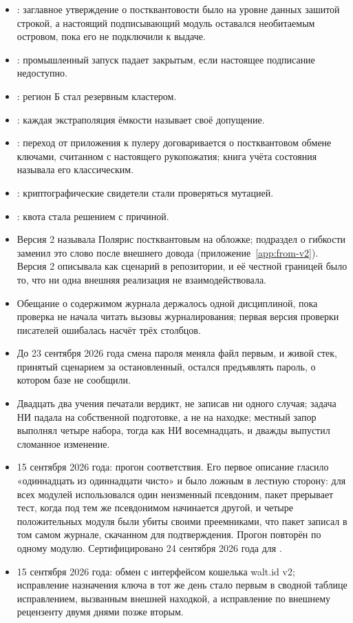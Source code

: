 \begin{itemize}
  \item {}: заглавное утверждение о постквантовости было на уровне данных зашитой строкой, а
    настоящий подписывающий модуль оставался необитаемым островом, пока его не подключили к выдаче.
  \item {}: промышленный запуск падает закрытым, если настоящее подписание недоступно.
  \item {}: регион Б стал резервным кластером.
  \item {}: каждая экстраполяция ёмкости называет своё допущение.
  \item {}: переход от приложения к пулеру договаривается о постквантовом обмене ключами,
    считанном с настоящего рукопожатия; книга учёта состояния называла его классическим.
  \item {}: криптографические свидетели стали проверяться мутацией.
  \item {}: квота стала решением с причиной.
  \item Версия 2 называла Полярис постквантовым на обложке; подраздел о гибкости заменил это слово
    после внешнего довода (приложение~\ref{app:from-v2}). Версия 2 описывала  как
    сценарий в репозитории, и её честной границей было то, что ни одна внешняя реализация не
    взаимодействовала.
  \item Обещание о содержимом журнала держалось одной дисциплиной, пока проверка не начала читать
    вызовы журналирования; первая версия проверки писателей ошибалась насчёт трёх столбцов.
  \item До 23 сентября 2026 года смена пароля меняла файл первым, и живой стек, принятый сценарием за
    остановленный, остался предъявлять пароль, о котором базе не сообщили.
  \item Двадцать два учения печатали вердикт, не записав ни одного случая; задача НИ падала на
    собственной подготовке, а не на находке; местный запор выполнял четыре набора, тогда как НИ
    восемнадцать, и дважды выпустил сломанное изменение.
\end{itemize}

\begin{itemize}
  \item 15 сентября 2026 года: прогон соответствия. Его первое описание гласило «одиннадцать из
    одиннадцати чисто» и было ложным в лестную сторону: для всех модулей использовался один
    неизменный псевдоним, пакет прерывает тест, когда под тем же псевдонимом начинается другой, и
    четыре положительных модуля были убиты своими преемниками, что пакет записал в том самом журнале,
    скачанном для подтверждения. Прогон повторён по одному модулю. Сертифицировано 24 сентября 2026
    года для .
  \item 15 сентября 2026 года: обмен с интерфейсом кошелька walt.id v2; исправление назначения ключа
    в тот же день стало первым в сводной таблице исправлением, вызванным внешней находкой, а
    исправление по внешнему рецензенту двумя днями позже вторым.
\end{itemize}

